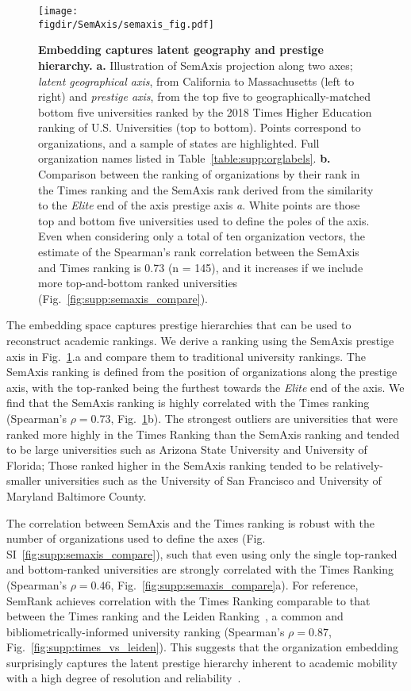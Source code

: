 \documentclass[12pt]{article} %
\def\figdir{../Figs}
\begin{document}
%
%
\begin{figure}[hp!]
	\centering
	\texttt{[image: \\figdir/SemAxis/semaxis\_fig.pdf]}
	\caption{
		\textbf{Embedding captures latent geography and prestige hierarchy.}
		\textbf{a.} Illustration of SemAxis projection along two axes;  \textit{latent geographical axis}, from California to Massachusetts (left to right) and \textit{prestige axis}, from the top five to geographically-matched bottom five universities ranked by the 2018 Times Higher Education ranking of U.S. Universities (top to bottom).
		Points correspond to organizations, and a sample of states are highlighted.
		Full organization names listed in Table~\ref{table:supp:orglabels}.
		\textbf{b.} Comparison between the ranking of organizations by their rank in the Times ranking and the SemAxis rank derived from the similarity to the \textit{Elite} end of the axis prestige axis \textit{a}.
		White points are those top and bottom five universities used to define the poles of the axis.
	  	Even when considering only a total of ten organization vectors, the estimate of the Spearman's rank correlation between the SemAxis and Times ranking is 0.73 (n = 145), and it increases if we include more top-and-bottom ranked universities (Fig.~\ref{fig:supp:semaxis_compare}).
	}
	\label{fig:semaxis}
\end{figure}


The embedding space captures prestige hierarchies that can be used to reconstruct academic rankings. 
We derive a ranking using the SemAxis prestige axis in Fig.~\ref{fig:semaxis}.a and compare them to traditional university rankings.
The SemAxis ranking is defined from the position of organizations along the prestige axis, with the top-ranked being the furthest towards the \textit{Elite} end of the axis.
We find that the SemAxis ranking is highly correlated with the Times ranking (Spearman's $\rho = 0.73$, Fig.~\ref{fig:semaxis}b).
The strongest outliers are universities that were ranked more highly in the Times Ranking than the SemAxis ranking and tended to be large universities such as Arizona State University and  University of Florida;
Those ranked higher in the SemAxis ranking tended to be relatively-smaller universities such as the University of San Francisco and University of Maryland Baltimore County.

The correlation between SemAxis and the Times ranking is robust with the number of organizations used to define the axes (Fig. SI~\ref{fig:supp:semaxis_compare}), such that even using only the single top-ranked and bottom-ranked universities are strongly correlated with the Times Ranking (Spearman's $\rho = 0.46$, Fig.~\ref{fig:supp:semaxis_compare}a).
For reference, SemRank achieves correlation with the Times Ranking comparable to that between the Times ranking and the Leiden Ranking~\autocite{waltman2012leidenrankings}, a common and bibliometrically-informed university ranking (Spearman's $\rho = 0.87$, Fig.~\ref{fig:supp:times_vs_leiden}).
This suggests that the organization embedding surprisingly captures the latent prestige hierarchy inherent to academic mobility with a high degree of resolution and reliability~\autocite{deville2014career, clauset2015hierarchy}. 
\end{document}
